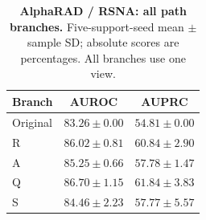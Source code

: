 \begin{table}[tp]
\centering
\caption{\textbf{AlphaRAD / RSNA: all path branches.} Five-support-seed mean $\pm$ sample SD; absolute scores are percentages. All branches use one view.}
\label{tab:supp-path-rsna_pneumonia}
\small
\setlength{\tabcolsep}{4pt}
\begin{tabular*}{\textwidth}{@{\extracolsep{\fill}}lcc@{}}
\toprule
Branch & AUROC & AUPRC \\
\midrule
Original & $83.26\pm0.00$ & $54.81\pm0.00$ \\
R & $86.02\pm0.81$ & $60.84\pm2.90$ \\
A & $85.25\pm0.66$ & $57.78\pm1.47$ \\
Q & $86.70\pm1.15$ & $61.84\pm3.83$ \\
S & $84.46\pm2.23$ & $57.77\pm5.57$ \\
\bottomrule
\end{tabular*}
\end{table}

